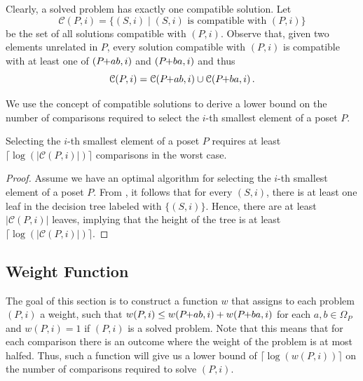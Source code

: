 \documentclass[a4paper,UKenglish,cleveref, autoref, thm-restate]{lipics-v2021}
\newcommand{\pchild}[3]{{#1}\kern-1pt{+}{#2}{#3}}
\begin{document}
Clearly, a solved problem has exactly one compatible solution.
Let
\begin{equation*}
  \mathcal{C}(P, i) = \{(S, i) \mid (S, i) \text{ is compatible with } (P, i)\}
\end{equation*}
be the set of all solutions compatible with $(P, i)$.
Observe that, given two elements unrelated in $P$, every solution compatible with $(P, i)$ is compatible with at least one of $(\pchild{P}{a}{b}, i)$ and $(\pchild{P}{b}{a}, i)$ and thus
\begin{equation}\label{lemma:compatible_union}
  \mathcal{C}(P, i) = \mathcal{C}(\pchild{P}{a}{b}, i) \cup \mathcal{C}(\pchild{P}{b}{a}, i)\,\text{.}
\end{equation}

We use the concept of compatible solutions to derive a lower bound on the number of comparisons required to select the $i$-th smallest element of a poset $P$.

\begin{theorem}\label{theorem:compatible_log}
  Selecting the $i$-th smallest element of a poset $P$ requires at least $\lceil\log(|\mathcal{C}(P, i)|)\rceil$ comparisons in the worst case.
\end{theorem}

\begin{proof}
  Assume we have an optimal algorithm for selecting the $i$-th smallest element of a poset $P$.
  From , it follows that for every $(S, i)$, there is at least one leaf in the decision tree labeled with $\{(S, i)\}$.
  Hence, there are at least $|\mathcal{C}(P, i)|$ leaves, implying that the height of the tree is at least $\lceil\log(|\mathcal{C}(P, i)|)\rceil$.
\end{proof}


\subsection{Weight Function}

The goal of this section is to construct a function $w$ that assigns to each problem $(P, i)$ a weight, such that $w(P,i) \le w(\pchild{P}{a}{b}, i) + w(\pchild{P}{b}{a},i)$ for each $a,b \in \Omega_P$ and $w(P,i) = 1$ if $(P, i)$ is a solved problem.
Note that this means that for each comparison there is an outcome where the weight of the problem is at most halfed.
Thus, such a function will give us a lower bound of $\lceil\log(w(P, i))\rceil$ on the number of comparisons required to solve $(P, i)$.
\end{document}
